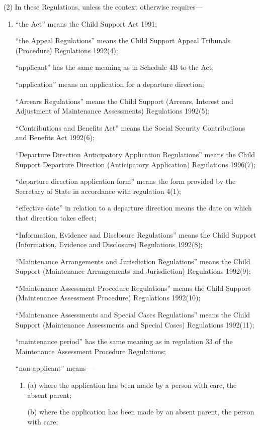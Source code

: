 \documentclass[a4paper]{article}
\begin{document}
(2) In these Regulations, unless the context otherwise requires—
\begin{enumerate}\item[]
“the Act” means the Child Support Act 1991;

“the Appeal Regulations” means the Child Support Appeal Tribunals (Procedure)
Regulations 1992(4);

“applicant” has the same meaning as in Schedule 4B to the Act;

“application” means an application for a departure direction;

“Arrears Regulations” means the Child Support (Arrears, Interest and Adjustment
of Maintenance Assessments) Regulations 1992(5);

“Contributions and Benefits Act” means the Social Security Contributions and
Benefits Act 1992(6);

“Departure Direction Anticipatory Application Regulations” means the Child
Support Departure Direction (Anticipatory Application) Regulations 1996(7);

“departure direction application form” means the form provided by the Secretary
of State in accordance with regulation 4(1);

“effective date” in relation to a departure direction means the date on which
that direction takes effect;

“Information, Evidence and Disclosure Regulations” means the Child Support
(Information, Evidence and Disclosure) Regulations 1992(8);

“Maintenance Arrangements and Jurisdiction Regulations” means the Child Support
(Maintenance Arrangements and Jurisdiction) Regulations 1992(9);

“Maintenance Assessment Procedure Regulations” means the Child Support
(Maintenance Assessment Procedure) Regulations 1992(10);

“Maintenance Assessments and Special Cases Regulations” means the Child Support
(Maintenance Assessments and Special Cases) Regulations 1992(11);

“maintenance period” has the same meaning as in regulation 33 of the Maintenance
Assessment Procedure Regulations;

“non-applicant” means—
\begin{enumerate}\item[]
(a) where the application has been made by a person with care, the absent parent;

(b) where the application has been made by an absent parent, the person with
care;
\end{enumerate}


\end{enumerate}
\end{document}

